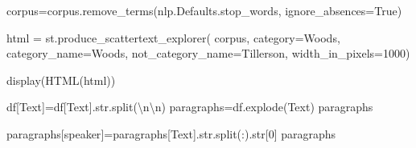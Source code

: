 \documentclass[
  letterpaper,
  DIV=11,
  numbers=noendperiod]{scrreprt}
\newenvironment{Shaded}{\begin{snugshade}}{\end{snugshade}}
\newcommand{\BuiltInTok}[1]{\textcolor[rgb]{0.00,0.23,0.31}{#1}}
\newcommand{\CharTok}[1]{\textcolor[rgb]{0.13,0.47,0.30}{#1}}
\newcommand{\DecValTok}[1]{\textcolor[rgb]{0.68,0.00,0.00}{#1}}
\newcommand{\NormalTok}[1]{\textcolor[rgb]{0.00,0.23,0.31}{#1}}
\newcommand{\OperatorTok}[1]{\textcolor[rgb]{0.37,0.37,0.37}{#1}}
\newcommand{\StringTok}[1]{\textcolor[rgb]{0.13,0.47,0.30}{#1}}
\newcommand{\VariableTok}[1]{\textcolor[rgb]{0.07,0.07,0.07}{#1}}
\begin{document}
\begin{Shaded}
\begin{Highlighting}[]
\NormalTok{corpus}\OperatorTok{=}\NormalTok{corpus.remove\_terms(nlp.Defaults.stop\_words, ignore\_absences}\OperatorTok{=}\VariableTok{True}\NormalTok{)}
\end{Highlighting}
\end{Shaded}

\begin{Shaded}
\begin{Highlighting}[]
\NormalTok{html }\OperatorTok{=}\NormalTok{ st.produce\_scattertext\_explorer(}
\NormalTok{                   corpus,}
\NormalTok{                   category}\OperatorTok{=}\StringTok{\textquotesingle{}Woods\textquotesingle{}}\NormalTok{,}
\NormalTok{                   category\_name}\OperatorTok{=}\StringTok{\textquotesingle{}Woods\textquotesingle{}}\NormalTok{,}
\NormalTok{                   not\_category\_name}\OperatorTok{=}\StringTok{\textquotesingle{}Tillerson\textquotesingle{}}\NormalTok{,}
\NormalTok{                   width\_in\_pixels}\OperatorTok{=}\DecValTok{1000}\NormalTok{)}

\NormalTok{display(HTML(html))}
\end{Highlighting}
\end{Shaded}

\begin{Shaded}
\begin{Highlighting}[]
\NormalTok{df[}\StringTok{\textquotesingle{}Text\textquotesingle{}}\NormalTok{]}\OperatorTok{=}\NormalTok{df[}\StringTok{\textquotesingle{}Text\textquotesingle{}}\NormalTok{].}\BuiltInTok{str}\NormalTok{.split(}\StringTok{\textquotesingle{}}\CharTok{\textbackslash{}n\textbackslash{}n}\StringTok{\textquotesingle{}}\NormalTok{)}
\NormalTok{paragraphs}\OperatorTok{=}\NormalTok{df.explode(}\StringTok{\textquotesingle{}Text\textquotesingle{}}\NormalTok{)}
\NormalTok{paragraphs}
\end{Highlighting}
\end{Shaded}

\begin{Shaded}
\begin{Highlighting}[]
\NormalTok{paragraphs[}\StringTok{\textquotesingle{}speaker\textquotesingle{}}\NormalTok{]}\OperatorTok{=}\NormalTok{paragraphs[}\StringTok{\textquotesingle{}Text\textquotesingle{}}\NormalTok{].}\BuiltInTok{str}\NormalTok{.split(}\StringTok{\textquotesingle{}:\textquotesingle{}}\NormalTok{).}\BuiltInTok{str}\NormalTok{[}\DecValTok{0}\NormalTok{]}
\NormalTok{paragraphs}
\end{Highlighting}
\end{Shaded}
\end{document}
